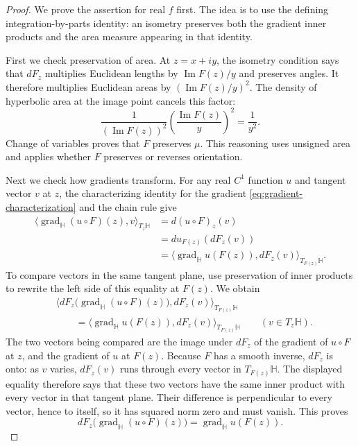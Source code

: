 \begin{proof}
We prove the assertion for real $f$ first. The idea is to use the defining integration-by-parts identity: an isometry preserves both the gradient inner products and the area measure appearing in that identity.

First we check preservation of area. At $z=x+iy$, the isometry condition says that $dF_z$ multiplies Euclidean lengths by $\operatorname{Im}F(z)/y$ and preserves angles. It therefore multiplies Euclidean areas by $(\operatorname{Im}F(z)/y)^2$. The density of hyperbolic area at the image point cancels this factor:
\[
 \frac1{(\operatorname{Im}F(z))^2}
 \left(\frac{\operatorname{Im}F(z)}{y}\right)^2
 =\frac1{y^2}.
\]
Change of variables proves that $F$ preserves $\mu$. This reasoning uses unsigned area and applies whether $F$ preserves or reverses orientation.

Next we check how gradients transform. For any real $C^1$ function $u$ and tangent vector $v$ at $z$, the characterizing identity for the gradient \eqref{eq:gradient-characterization} and the chain rule give
\[
 \begin{aligned}
 \langle\operatorname{grad}_{\mathbb H}(u\circ F)(z),v\rangle_{T_z\mathbb H}
 &=d(u\circ F)_z(v)\\
 &=du_{F(z)}(dF_z(v))\\
 &=\langle\operatorname{grad}_{\mathbb H}u(F(z)),dF_z(v)\rangle_{T_{F(z)}\mathbb H}.
 \end{aligned}
\]
To compare vectors in the same tangent plane, use preservation of inner products to rewrite the left side of this equality at $F(z)$. We obtain
\[
 \begin{aligned}
 &\bigl\langle dF_z\bigl(\operatorname{grad}_{\mathbb H}(u\circ F)(z)\bigr),
                  dF_z(v)\bigr\rangle_{T_{F(z)}\mathbb H}\\
 &\qquad=\langle\operatorname{grad}_{\mathbb H}u(F(z)),
                  dF_z(v)\rangle_{T_{F(z)}\mathbb H}
 \qquad(v\in T_z\mathbb H).
 \end{aligned}
\]
The two vectors being compared are the image under $dF_z$ of the gradient of $u\circ F$ at $z$, and the gradient of $u$ at $F(z)$. Because $F$ has a smooth inverse, $dF_z$ is onto: as $v$ varies, $dF_z(v)$ runs through every vector in $T_{F(z)}\mathbb H$. The displayed equality therefore says that these two vectors have the same inner product with every vector in that tangent plane. Their difference is perpendicular to every vector, hence to itself, so it has squared norm zero and must vanish. This proves
\begin{equation}\label{eq:gradient-transport}
 dF_z\bigl(\operatorname{grad}_{\mathbb H}(u\circ F)(z)\bigr)
 =\operatorname{grad}_{\mathbb H}u(F(z)).
\end{equation}


\end{proof}
